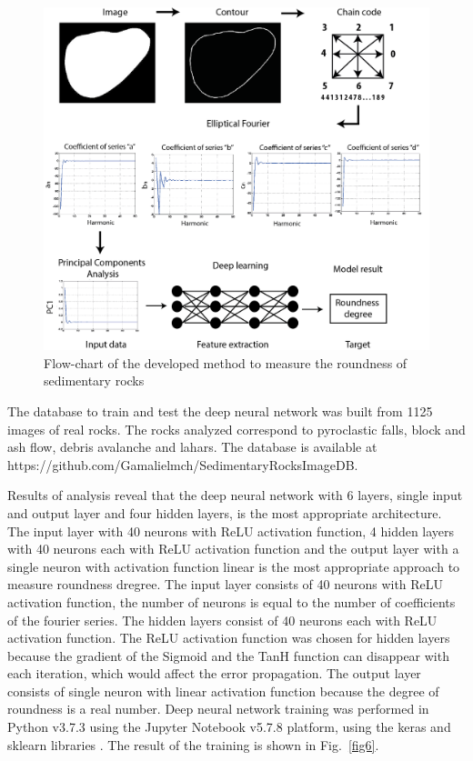 \documentclass[conference]{IEEEtran}
\begin{document}
\begin{figure}[htbp]
\centerline{\includegraphics[scale=0.6]{fig5.png}}
\caption{Flow-chart of the developed method to measure the roundness of sedimentary rocks}
\label{fig5}
\end{figure}

The database to train and test the deep neural network was built from 1125 images of real rocks. The rocks analyzed correspond to pyroclastic falls, block and ash flow, debris avalanche and lahars. The database is available at https://github.com/Gamalielmch/SedimentaryRocksImageDB.

Results of analysis reveal that the deep neural network with 6 layers, single input and output layer and four hidden layers, is the most appropriate architecture. The input layer with 40 neurons with ReLU activation function, 4 hidden layers with 40 neurons each with ReLU activation function and the output layer with a single neuron with activation function linear is the most appropriate approach to measure roundness dregree. The input layer consists of 40 neurons with ReLU activation function, the number of neurons is equal to the number of coefficients of the fourier series. The hidden layers consist of 40 neurons each with ReLU activation function.
The ReLU activation function was chosen for hidden layers because the gradient of the Sigmoid and the TanH function can disappear with each iteration, which would affect the error propagation. The output layer consists of single neuron with linear activation function because the degree of roundness is a real number. Deep neural network training was performed in Python v3.7.3 using the Jupyter Notebook v5.7.8 platform, using the keras and sklearn libraries \cite{b13}. The result of the training is shown in Fig.~\ref{fig6}.
\end{document}
